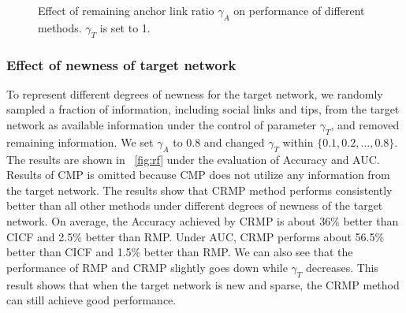 \documentclass[conference]{IEEEtran}
\begin{document}
\begin{figure}[!t]
\centering
{}
{}
\caption{Effect of remaining anchor link ratio $\gamma_A$ on performance of different methods. $\gamma_T$ is set to 1.}
\label{fig:ra}
\end{figure}

\subsubsection{Effect of newness of target network}
To represent different degrees of newness for the target network, we randomly sampled a fraction of information, including social links and tips, from the target network as available information under the control of parameter $\gamma_T$, and removed remaining information. We set $\gamma_A$ to 0.8 and changed $\gamma_T$ within $\{0.1,0.2,\dots,0.8\}$. The results are shown in \figurename~\ref{fig:rf} under the evaluation of Accuracy and AUC. Results of CMP is omitted because CMP does not utilize any information from the target network. The results show that CRMP method performs consistently better than all other methods under different degrees of newness of the target network. On average, the Accuracy achieved by CRMP is about 36\% better than CICF and 2.5\% better than RMP. Under AUC, CRMP performs about 56.5\% better than CICF and 1.5\% better than RMP. We can also see that the performance of RMP and CRMP slightly goes down while $\gamma_T$ decreases. This result shows that when the target network is new and sparse, the CRMP method can still achieve good performance.

\newcommand{\targetplot}[2]{
\begin{tikzpicture}
\begin{axis}
[
tiny,
width=1.9in,
legend style={at={(0.5,1.31)},
/tikz/every even column/.append style={column sep=0.2cm},
      anchor=north,legend columns=2, draw=none},
legend cell align=center,
ymin=0.45,ymax=#2,
xmin=0.0,xmax=0.9,
xtick={0.1, 0.2, 0.3, 0.4, 0.5, 0.6, 0.7, 0.8},
xmajorgrids,
ymajorgrids,
y tick label style={
    /pgf/number format/.cd,
        fixed,
        fixed zerofill,
        precision=2,
    /tikz/.cd
},
legend entries={CICF, CRMP, RMP},
]
\addplot[color=darkgray,thick,error bars/.cd,y dir=both,y explicit,] table[y error=e] {results/target-#1-cicf-ht.dat};
\addplot[color=cyan,thick,error bars/.cd,y dir=both,y explicit,] table[y error=e] {results/target-#1-crmp-ht.dat};
\addplot[color=orange,thick,error bars/.cd,y dir=both,y explicit,] table[y error=e] {results/target-#1-rmp-ht.dat};
\end{axis}
\end{tikzpicture}
}
\end{document}
